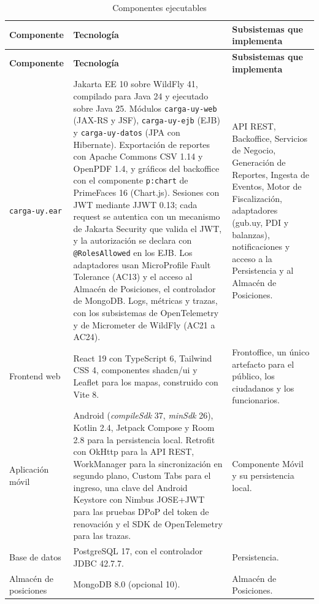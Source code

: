 \begin{longtable}{|p{3.3cm}|p{5.4cm}|p{6.8cm}|}
    \caption{Componentes ejecutables}\label{tab:ejecutables}\\
    \hline
    \textbf{Componente} & \textbf{Tecnología} & \textbf{Subsistemas que implementa} \\
    \hline
    \endfirsthead
    \hline
    \textbf{Componente} & \textbf{Tecnología} & \textbf{Subsistemas que implementa} \\
    \hline
    \endhead
    \texttt{carga-uy.ear} & Jakarta EE 10 sobre WildFly 41, compilado para Java 24 y ejecutado sobre Java 25. Módulos \texttt{carga-uy-web} (JAX-RS y JSF), \texttt{carga-uy-ejb} (EJB) y \texttt{carga-uy-datos} (JPA con Hibernate). Exportación de reportes con Apache Commons CSV 1.14 y OpenPDF 1.4, y gráficos del backoffice con el componente \texttt{p:chart} de PrimeFaces 16 (Chart.js). Sesiones con JWT mediante JJWT 0.13; cada request se autentica con un mecanismo de Jakarta Security que valida el JWT, y la autorización se declara con \texttt{@RolesAllowed} en los EJB. Los adaptadores usan MicroProfile Fault Tolerance (AC13) y el acceso al Almacén de Posiciones, el controlador de MongoDB. Logs, métricas y trazas, con los subsistemas de OpenTelemetry y de Micrometer de WildFly (AC21 a AC24). & API REST, Backoffice, Servicios de Negocio, Generación de Reportes, Ingesta de Eventos, Motor de Fiscalización, adaptadores (gub.uy, PDI y balanzas), notificaciones y acceso a la Persistencia y al Almacén de Posiciones. \\
    \hline
    Frontend web & React 19 con TypeScript 6, Tailwind CSS 4, componentes shadcn/ui y Leaflet para los mapas, construido con Vite 8. & Frontoffice, un único artefacto para el público, los ciudadanos y los funcionarios. \\
    \hline
    Aplicación móvil & Android (\textit{compileSdk} 37, \textit{minSdk} 26), Kotlin 2.4, Jetpack Compose y Room 2.8 para la persistencia local. Retrofit con OkHttp para la API REST, WorkManager para la sincronización en segundo plano, Custom Tabs para el ingreso, una clave del Android Keystore con Nimbus JOSE+JWT para las pruebas DPoP del token de renovación y el SDK de OpenTelemetry para las trazas. & Componente Móvil y su persistencia local. \\
    \hline
    Base de datos & PostgreSQL 17, con el controlador JDBC 42.7.7. & Persistencia. \\
    \hline
    Almacén de posiciones & MongoDB 8.0 (opcional 10). & Almacén de Posiciones. \\

\end{longtable}

